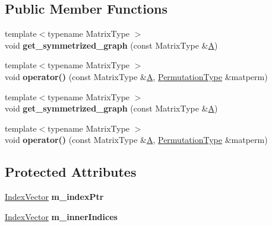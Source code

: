 \subsection*{Public Member Functions}
\begin{DoxyCompactItemize}
\item 
\mbox{\label{class_eigen_1_1_metis_ordering_ab3919cd70a1bfe70df6b6fc822e9b42b}} 
{\footnotesize template$<$typename Matrix\+Type $>$ }\\void {\bfseries get\+\_\+symmetrized\+\_\+graph} (const Matrix\+Type \&\hyperlink{group___core___module_class_eigen_1_1_matrix}{A})
\item 
\mbox{\label{class_eigen_1_1_metis_ordering_a48e1dc18153e426849b8f20c3a03a9c6}} 
{\footnotesize template$<$typename Matrix\+Type $>$ }\\void {\bfseries operator()} (const Matrix\+Type \&\hyperlink{group___core___module_class_eigen_1_1_matrix}{A}, \hyperlink{group___core___module}{Permutation\+Type} \&matperm)
\item 
\mbox{\label{class_eigen_1_1_metis_ordering_ab3919cd70a1bfe70df6b6fc822e9b42b}} 
{\footnotesize template$<$typename Matrix\+Type $>$ }\\void {\bfseries get\+\_\+symmetrized\+\_\+graph} (const Matrix\+Type \&\hyperlink{group___core___module_class_eigen_1_1_matrix}{A})
\item 
\mbox{\label{class_eigen_1_1_metis_ordering_a48e1dc18153e426849b8f20c3a03a9c6}} 
{\footnotesize template$<$typename Matrix\+Type $>$ }\\void {\bfseries operator()} (const Matrix\+Type \&\hyperlink{group___core___module_class_eigen_1_1_matrix}{A}, \hyperlink{group___core___module}{Permutation\+Type} \&matperm)
\end{DoxyCompactItemize}
\subsection*{Protected Attributes}
\begin{DoxyCompactItemize}
\item 
\mbox{\label{class_eigen_1_1_metis_ordering_aad9795eab17371180f140e344c2c3e36}} 
\hyperlink{group___core___module}{Index\+Vector} {\bfseries m\+\_\+index\+Ptr}
\item 
\mbox{\label{class_eigen_1_1_metis_ordering_ad094d620880147d0c138eb2d1790ab32}} 
\hyperlink{group___core___module}{Index\+Vector} {\bfseries m\+\_\+inner\+Indices}
\end{DoxyCompactItemize}


